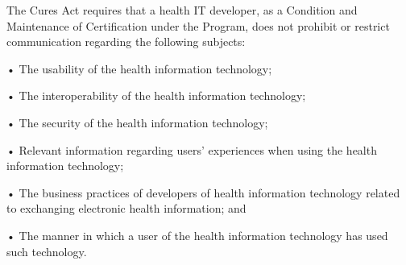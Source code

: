 \documentclass[twoside,11pt]{article}
\begin{document}
          The Cures Act requires that a health IT developer, as a Condition and Maintenance of Certification under the Program, does not prohibit or restrict communication regarding the following subjects:


          • The usability of the health information technology;


          • The interoperability of the health information technology;


          • The security of the health information technology;


          • Relevant information regarding users' experiences when using the health information technology;


          • The business practices of developers of health information technology related to exchanging electronic health information; and


          • The manner in which a user of the health information technology has used such technology.
\end{document}
